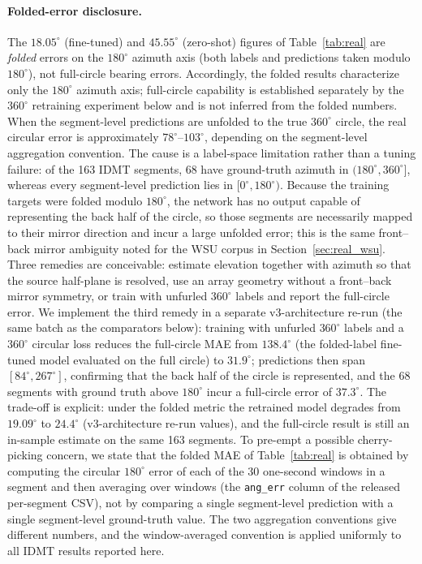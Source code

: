 \documentclass[sensors,article,submit,pdftex,moreauthors]{Definitions/mdpi}
\begin{document}
\paragraph{Folded-error disclosure.}
The $18.05^\circ$ (fine-tuned) and $45.55^\circ$ (zero-shot) figures of Table~\ref{tab:real} are \emph{folded} errors on the $180^\circ$ azimuth axis (both labels and predictions taken modulo $180^\circ$), not full-circle bearing errors. Accordingly, the folded results characterize only the $180^\circ$ azimuth axis; full-circle capability is established separately by the $360^\circ$ retraining experiment below and is not inferred from the folded numbers. When the segment-level predictions are unfolded to the true $360^\circ$ circle, the real circular error is approximately $78^\circ$--$103^\circ$, depending on the segment-level aggregation convention. The cause is a label-space limitation rather than a tuning failure: of the 163 IDMT segments, 68 have ground-truth azimuth in $(180^\circ,360^\circ]$, whereas every segment-level prediction lies in $[0^\circ,180^\circ)$. Because the training targets were folded modulo $180^\circ$, the network has no output capable of representing the back half of the circle, so those segments are necessarily mapped to their mirror direction and incur a large unfolded error; this is the same front--back mirror ambiguity noted for the WSU corpus in Section~\ref{sec:real_wsu}. Three remedies are conceivable: estimate elevation together with azimuth so that the source half-plane is resolved, use an array geometry without a front--back mirror symmetry, or train with unfurled $360^\circ$ labels and report the full-circle error. We implement the third remedy in a separate v3-architecture re-run (the same batch as the comparators below): training with unfurled $360^\circ$ labels and a $360^\circ$ circular loss reduces the full-circle MAE from $138.4^\circ$ (the folded-label fine-tuned model evaluated on the full circle) to $31.9^\circ$; predictions then span $[84^\circ,267^\circ]$, confirming that the back half of the circle is represented, and the 68 segments with ground truth above $180^\circ$ incur a full-circle error of $37.3^\circ$. The trade-off is explicit: under the folded metric the retrained model degrades from $19.09^\circ$ to $24.4^\circ$ (v3-architecture re-run values), and the full-circle result is still an in-sample estimate on the same 163 segments. To pre-empt a possible cherry-picking concern, we state that the folded MAE of Table~\ref{tab:real} is obtained by computing the circular $180^\circ$ error of each of the 30 one-second windows in a segment and then averaging over windows (the \texttt{ang\_err} column of the released per-segment CSV), not by comparing a single segment-level prediction with a single segment-level ground-truth value. The two aggregation conventions give different numbers, and the window-averaged convention is applied uniformly to all IDMT results reported here.
\end{document}
